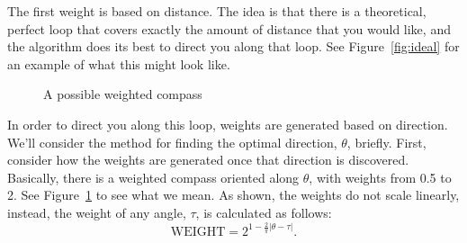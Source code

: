 \documentclass[twocolumn,11pt]{article}
\begin{document}
The first weight is based on distance. The idea is that there is a theoretical,
perfect loop that covers exactly the amount of distance that you would like,
and the algorithm does its best to direct you along that loop. See
Figure~\ref{fig:ideal} for an example of what this might look like.

\begin{figure}
  \centering
  \caption{A possible weighted compass} \label{fig:weights}
\end{figure}

In order to direct you along this loop, weights are generated based on
direction. We'll consider the method for finding the optimal direction,
$\theta$, briefly. First, consider how the weights are generated once
that direction is discovered. Basically, there is a weighted compass oriented
along $\theta$, with weights from 0.5 to 2. See Figure~\ref{fig:weights} to
see what we mean. As shown, the weights do not scale linearly, instead, the
weight of any angle, $\tau$, is calculated as follows:
\begin{equation}
  \mbox{WEIGHT} = 2^{1-\frac{2}{\pi}|\theta-\tau|}. \label{eq:weight}
\end{equation}
\end{document}

